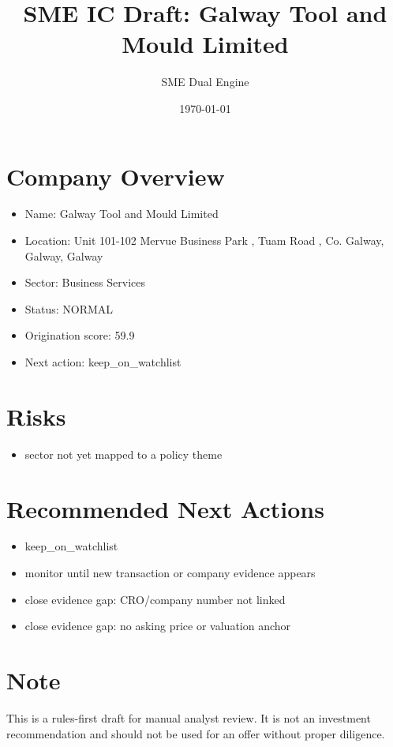 \documentclass[11pt,a4paper]{article}
\title{SME IC Draft: Galway Tool and Mould Limited}
\author{SME Dual Engine}
\date{\today}
\begin{document}
\maketitle
\section*{Company Overview}
\begin{itemize}[leftmargin=1.4em]
\item Name: Galway Tool and Mould Limited
\item Location: Unit 101-102 Mervue Business Park , Tuam Road , Co. Galway, Galway, Galway
\item Sector: Business Services
\item Status: NORMAL
\item Origination score: 59.9
\item Next action: keep\_on\_watchlist
\end{itemize}
\section*{Risks}
\begin{itemize}[leftmargin=1.4em]
\item sector not yet mapped to a policy theme
\end{itemize}
\section*{Recommended Next Actions}
\begin{itemize}[leftmargin=1.4em]
\item keep\_on\_watchlist
\item monitor until new transaction or company evidence appears
\item close evidence gap: CRO/company number not linked
\item close evidence gap: no asking price or valuation anchor
\end{itemize}
\section*{Note}
This is a rules-first draft for manual analyst review. It is not an investment
recommendation and should not be used for an offer without proper diligence.
\end{document}
